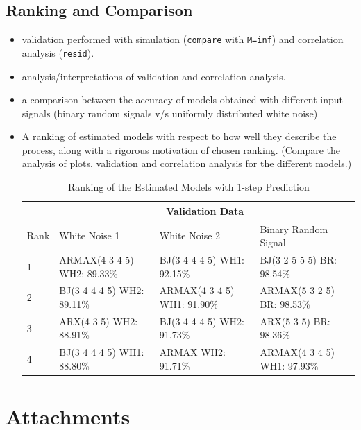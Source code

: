 \documentclass[10pt,a4paper]{article}
\begin{document}
\subsection{Ranking and Comparison}
\begin{itemize}
   \item validation performed with simulation (\texttt{compare} with \texttt{M=inf}) and correlation analysis (\texttt{resid}).
   \item analysis/interpretations of validation and correlation analysis.
   \item a comparison between the accuracy of models obtained with different input signals (binary random signals v/s uniformly distributed white noise)
   \item A ranking of estimated models with respect to how well they describe the process, along with a rigorous motivation of chosen ranking. (Compare the analysis of plots, validation and correlation analysis for the different models.)
	\begin{table}[h]
		\footnotesize
		\centering
		\caption{Ranking of the Estimated Models with 1-step Prediction}
		\label{table:rank}
		\begin{tabular}{|l|lll|}
		\hline
		& \multicolumn{3}{c|}{Validation Data} \\
		\hline
		Rank & White Noise 1 & White Noise 2 & Binary Random Signal\\
		\hline
		1 & ARMAX(4 3 4 5) WH2: 89.33\% & BJ(3 4 4 4 5) WH1: 92.15\% & BJ(3 2 5 5 5) BR: 98.54\% \\
		2 & BJ(3 4 4 4 5) WH2: 89.11\% & ARMAX(4 3 4 5) WH1: 91.90\% & ARMAX(5 3 2 5) BR: 98.53\% \\
		3 & ARX(4 3 5) WH2: 88.91\% & BJ(3 4 4 4 5) WH2: 91.73\% & ARX(5 3 5) BR: 98.36\%\\
		4 & BJ(3 4 4 4 5) WH1: 88.80\% & ARMAX WH2: 91.71\% & ARMAX(4 3 4 5) WH1: 97.93\%\\
		\hline
		\end{tabular}
	\end{table}
\end{itemize}

\newpage
\section*{Attachments}
	\label{matlabCode}
    
	
	
	
\end{document}
